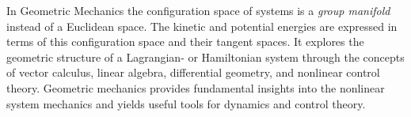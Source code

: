 %

In Geometric Mechanics the configuration space of systems is a \textit{group manifold} instead of a Euclidean space. The kinetic and potential energies are expressed in terms of this configuration space and their tangent spaces. It explores the geometric structure of a Lagrangian- or Hamiltonian system through the concepts of vector calculus, linear algebra, differential geometry, and nonlinear control theory. Geometric mechanics provides fundamental insights into the nonlinear system mechanics and yields useful tools for dynamics and control theory.


